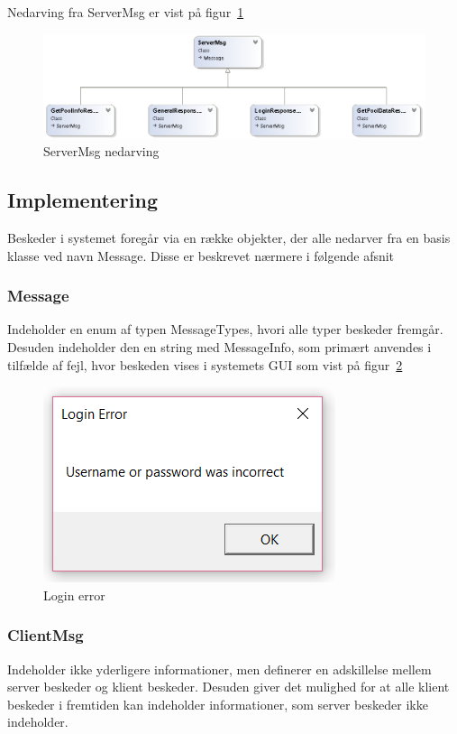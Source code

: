 Nedarving fra ServerMsg er vist på figur~\ref{fig:ServerMsgUML}
\begin{figure}
	\centering
	\includegraphics[width=0.9\linewidth]{figs/connection/ServerMsgUML.png}
	\caption{ServerMsg nedarving}
	\label{fig:ServerMsgUML}
\end{figure}

\subsection{Implementering}
Beskeder i systemet foregår via en række objekter, der alle nedarver fra en basis klasse ved navn Message. Disse er beskrevet nærmere i følgende afsnit

\subsubsection{Message}
Indeholder en enum af typen MessageTypes, hvori alle typer beskeder fremgår. Desuden indeholder den en string med MessageInfo, som primært anvendes i tilfælde af fejl, hvor beskeden vises i systemets GUI som vist på figur~\ref{fig:loginError}

\begin{figure}
	\centering
	\includegraphics[width=0.3\linewidth]{figs/connection/loginError.png}
	\caption{Login error}
	\label{fig:loginError}
\end{figure}

\subsubsection{ClientMsg}
Indeholder ikke yderligere informationer, men definerer en adskillelse mellem server beskeder og klient beskeder. Desuden giver det mulighed for at alle klient beskeder i fremtiden kan indeholder informationer, som server beskeder ikke indeholder. 


